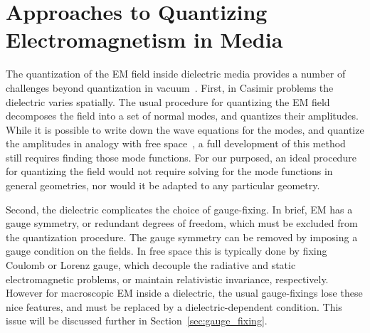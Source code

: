 \section{Approaches to Quantizing Electromagnetism in Media}
\label{sec:quantizing}
The quantization of the EM field inside dielectric media provides a number of challenges 
beyond quantization in vacuum~\citep{Huttner1992,Dung1998,Bechler1999,Bordag1998,Rahi2009,Reid2013}.  
 First, in Casimir problems the dielectric varies spatially.  The usual procedure for
quantizing the EM field decomposes the field into a set of normal modes, and quantizes their amplitudes.
 While it is possible to write down the wave equations for the modes, and quantize the amplitudes
 in analogy with free space~\citep{Glauber1991}, a full development of this method still requires finding those mode functions.
For our purposed, an ideal procedure for quantizing the field would not require solving for the mode functions in
general geometries, nor would it be adapted to any particular geometry.   

Second, the dielectric complicates the choice of gauge-fixing.  
In brief, EM has a gauge symmetry, or redundant degrees of freedom, which must be 
excluded from the quantization procedure.  
The gauge symmetry can be removed by imposing a gauge condition on the fields.
  In free space this is typically done by fixing Coulomb or Lorenz gauge, which 
decouple the radiative and static electromagnetic problems, or maintain relativistic invariance, respectively.
However for macroscopic EM inside a dielectric, the usual gauge-fixings lose these nice
features, and must be replaced by a dielectric-dependent condition.  
This issue will be discussed further in Section~\ref{sec:gauge_fixing}.

